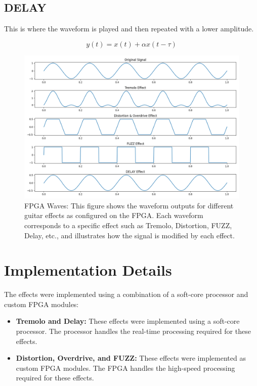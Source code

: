 \documentclass{article}
\begin{document}
\subsection{DELAY}
This is where the waveform is played and then repeated with a lower amplitude.

\begin{equation}
y(t) = x(t) + \alpha x(t - \tau)
\end{equation}

\begin{figure}[h]
    \centering
    \includegraphics[width=\textwidth]{FPGA_waves.png}
    \caption{FPGA Waves: This figure shows the waveform outputs for different guitar effects as configured on the FPGA. Each waveform corresponds to a specific effect such as Tremolo, Distortion, FUZZ, Delay, etc., and illustrates how the signal is modified by each effect.}
    \label{fig:fpga_waves}
\end{figure}

\section{Implementation Details}
The effects were implemented using a combination of a soft-core processor and custom FPGA modules:
\begin{itemize}
    \item \textbf{Tremolo and Delay:} These effects were implemented using a soft-core processor. The processor handles the real-time processing required for these effects.
    \item \textbf{Distortion, Overdrive, and FUZZ:} These effects were implemented as custom FPGA modules. The FPGA handles the high-speed processing required for these effects.
\end{itemize}
\end{document}
